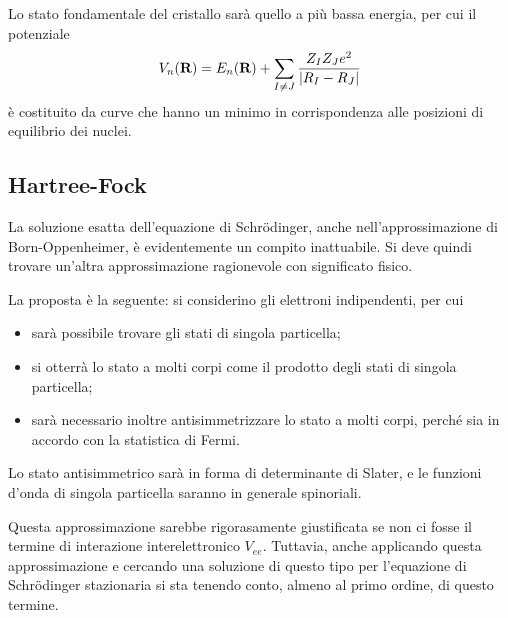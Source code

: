 Lo stato fondamentale del cristallo sarà quello a più bassa energia, per cui il potenziale
\[ V_n(\textbf{R}) = E_n(\textbf{R}) + \sum_{I \neq J} \frac{Z_I Z_J e^2}{\abs{R_I - R_J}} \]
è costituito da curve che hanno un minimo in corrispondenza alle posizioni di equilibrio dei nuclei.

\subsection{Hartree-Fock}

La soluzione esatta dell'equazione di Schrödinger, anche nell'approssimazione di Born-Oppenheimer, è evidentemente un compito inattuabile. Si deve quindi trovare un'altra approssimazione ragionevole con significato fisico.

La proposta è la seguente: si considerino gli elettroni indipendenti, per cui 
\begin{itemize}
	\item sarà possibile trovare gli stati di singola particella;
	\item si otterrà lo stato a molti corpi come il prodotto degli stati di singola particella;
	\item sarà necessario inoltre antisimmetrizzare lo stato a molti corpi, perché sia in accordo con la statistica di Fermi.
\end{itemize}
Lo stato antisimmetrico sarà in forma di determinante di Slater, e le funzioni d'onda di singola particella saranno in generale spinoriali.

Questa approssimazione sarebbe rigorasamente giustificata se non ci fosse il termine di interazione interelettronico $ V_{ee} $.
Tuttavia, anche applicando questa approssimazione e cercando una soluzione di questo tipo per l'equazione di Schrödinger stazionaria si sta tenendo conto, almeno al primo ordine, di questo termine.

